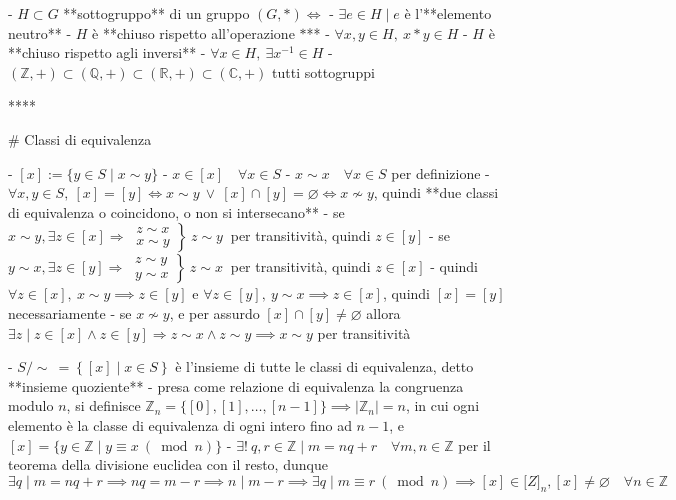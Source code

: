 - $H \subset G$ **sottogruppo** di un gruppo $(G, *)\iff$
    - $\exists e \in H \mid e$ è l'**elemento neutro**
    - $H$ è **chiuso rispetto all'operazione $*$**
        - $\forall x, y \in H, \ x * y \in H$
    -  $H$ è **chiuso rispetto agli inversi**
        -  $\forall x \in H, \ \exists x^{-1} \in H$
-  \( (\mathbb{Z},+) \subset(\mathbb{Q},+) \subset(\mathbb{R},+) \subset(\mathbb{C},+) \) tutti sottogruppi

****

# Classi di equivalenza

- $[x] := \{y \in S \mid x \sim y\}$
  - $x \in [x] \quad \forall x \in S$
    - $x \sim x \quad \forall x \in S$ per definizione
  - $\forall x, y \in S, \ [x] = [y] \iff x \sim y \ \lor \ [x] \cap [y] = \varnothing \iff x \nsim y$, quindi **due classi di equivalenza o coincidono, o non si intersecano**
      - se \( \left.x \sim y, \exists z \in[x] \Rightarrow \ \begin{array}{ll}z  \sim x \\ x \sim y\end{array}\right\} \ z \sim y \ \) per transitività, quindi $z \in [y]$
      - se \( \left.y \sim x, \exists z \in[y] \Rightarrow \ \begin{array}{l}z \sim y \\ y \sim x\end{array}\right\} \ z \sim x \ \) per transitività, quindi $z \in [x]$
      - quindi \( \forall z \in[x], \ x \sim y \implies z \in[y] \) e $\forall z \in  [y], \ y \sim x \implies z \in [x]$, quindi $[x] = [y]$ necessariamente
      - se $x \nsim y$, e per assurdo \( [x] \cap[y] \neq \varnothing \) allora \( \exists z \mid z \in[x] \wedge z \in[y] \Rightarrow z \sim x \wedge z \sim y \implies x \sim y \) per transitività

- \(S/ \sim \ = \left\{ [x] \mid x \in S\right\}\) è l'insieme di tutte le classi di equivalenza, detto **insieme quoziente**
  - presa come relazione di equivalenza la congruenza modulo $n$, si definisce $\mathbb{Z}_n = \{ [0], [1], \ldots,[n - 1]\} \implies \mid \mathbb{Z}_n \mid = n$, in cui ogni elemento è la classe di equivalenza di ogni intero fino ad $n - 1$, e $[x] = \{y \in \mathbb{Z} \mid y \equiv x  \ (\bmod n )\}$
  - \( \exists ! \ q, r \in \mathbb{Z} \mid m=n q+r \quad \forall m, n \in \mathbb{Z} \) per il teorema della divisione euclidea con il resto, dunque \( \exists q \mid  m=n q+r \implies n q=m-r \implies n \mid m-r \implies \exists q \mid m \equiv r \ (\bmod n) \implies [x] \in \mathbb[Z]_n, [x] \neq \varnothing \quad \forall n \in \mathbb{Z}\)

